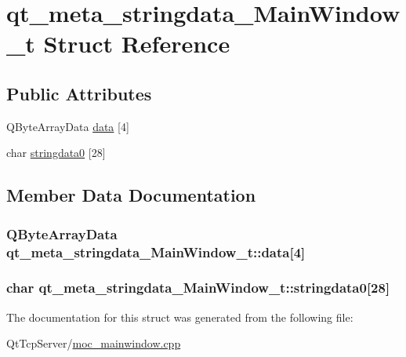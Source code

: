 \hypertarget{structqt__meta__stringdata___main_window__t}{}\section{qt\+\_\+meta\+\_\+stringdata\+\_\+\+Main\+Window\+\_\+t Struct Reference}
\label{structqt__meta__stringdata___main_window__t}
\subsection*{Public Attributes}
\begin{DoxyCompactItemize}
\item 
Q\+Byte\+Array\+Data \hyperlink{structqt__meta__stringdata___main_window__t_a332d7fa058028f7613b5ba68abb5a7fe}{data} \mbox{[}4\mbox{]}
\item 
char \hyperlink{structqt__meta__stringdata___main_window__t_a10e266ffded4c5e956d35d922fa94828}{stringdata0} \mbox{[}28\mbox{]}
\end{DoxyCompactItemize}


\subsection{Member Data Documentation}
\subsubsection[{\texorpdfstring{data}{data}}]{\setlength{\rightskip}{0pt plus 5cm}Q\+Byte\+Array\+Data qt\+\_\+meta\+\_\+stringdata\+\_\+\+Main\+Window\+\_\+t\+::data\mbox{[}4\mbox{]}}\hypertarget{structqt__meta__stringdata___main_window__t_a332d7fa058028f7613b5ba68abb5a7fe}{}\label{structqt__meta__stringdata___main_window__t_a332d7fa058028f7613b5ba68abb5a7fe}
\subsubsection[{\texorpdfstring{stringdata0}{stringdata0}}]{\setlength{\rightskip}{0pt plus 5cm}char qt\+\_\+meta\+\_\+stringdata\+\_\+\+Main\+Window\+\_\+t\+::stringdata0\mbox{[}28\mbox{]}}\hypertarget{structqt__meta__stringdata___main_window__t_a10e266ffded4c5e956d35d922fa94828}{}\label{structqt__meta__stringdata___main_window__t_a10e266ffded4c5e956d35d922fa94828}


The documentation for this struct was generated from the following file\+:\begin{DoxyCompactItemize}
\item 
Qt\+Tcp\+Server/\hyperlink{moc__mainwindow_8cpp}{moc\+\_\+mainwindow.\+cpp}\end{DoxyCompactItemize}
